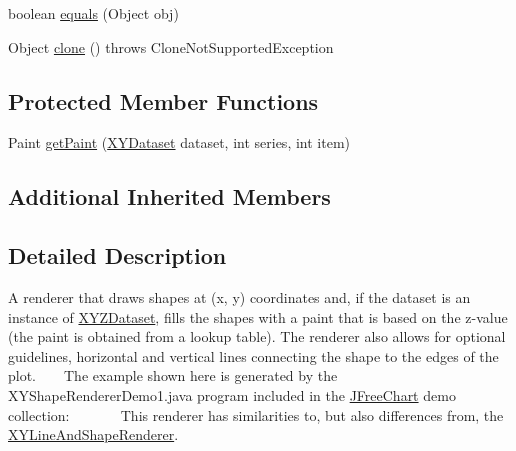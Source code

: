 \begin{DoxyCompactItemize}
\item 
boolean \mbox{\hyperlink{classorg_1_1jfree_1_1chart_1_1renderer_1_1xy_1_1_x_y_shape_renderer_aea8dcf465ece04c0939704894528f306}{equals}} (Object obj)
\item 
Object \mbox{\hyperlink{classorg_1_1jfree_1_1chart_1_1renderer_1_1xy_1_1_x_y_shape_renderer_ab5390f7fd4aa6ffa788ee89bca456067}{clone}} ()  throws Clone\+Not\+Supported\+Exception 
\end{DoxyCompactItemize}
\subsection*{Protected Member Functions}
\begin{DoxyCompactItemize}
\item 
Paint \mbox{\hyperlink{classorg_1_1jfree_1_1chart_1_1renderer_1_1xy_1_1_x_y_shape_renderer_aba73d86bea4affab0067ca62cc9a68d4}{get\+Paint}} (\mbox{\hyperlink{interfaceorg_1_1jfree_1_1data_1_1xy_1_1_x_y_dataset}{X\+Y\+Dataset}} dataset, int series, int item)
\end{DoxyCompactItemize}
\subsection*{Additional Inherited Members}


\subsection{Detailed Description}
A renderer that draws shapes at (x, y) coordinates and, if the dataset is an instance of \mbox{\hyperlink{}{X\+Y\+Z\+Dataset}}, fills the shapes with a paint that is based on the z-\/value (the paint is obtained from a lookup table). The renderer also allows for optional guidelines, horizontal and vertical lines connecting the shape to the edges of the plot. ~\newline
~\newline
 The example shown here is generated by the {\ttfamily X\+Y\+Shape\+Renderer\+Demo1.\+java} program included in the \mbox{\hyperlink{classorg_1_1jfree_1_1chart_1_1_j_free_chart}{J\+Free\+Chart}} demo collection\+: ~\newline
~\newline
  ~\newline
~\newline
 This renderer has similarities to, but also differences from, the \mbox{\hyperlink{classorg_1_1jfree_1_1chart_1_1renderer_1_1xy_1_1_x_y_line_and_shape_renderer}{X\+Y\+Line\+And\+Shape\+Renderer}}.

